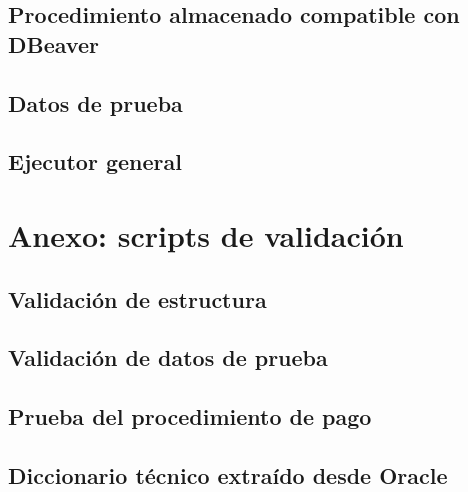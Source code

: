 

\subsection{Procedimiento almacenado compatible con DBeaver}



\subsection{Datos de prueba}



\subsection{Ejecutor general}



\section{Anexo: scripts de validación}

\subsection{Validación de estructura}



\subsection{Validación de datos de prueba}



\subsection{Prueba del procedimiento de pago}



\subsection{Diccionario técnico extraído desde Oracle}


